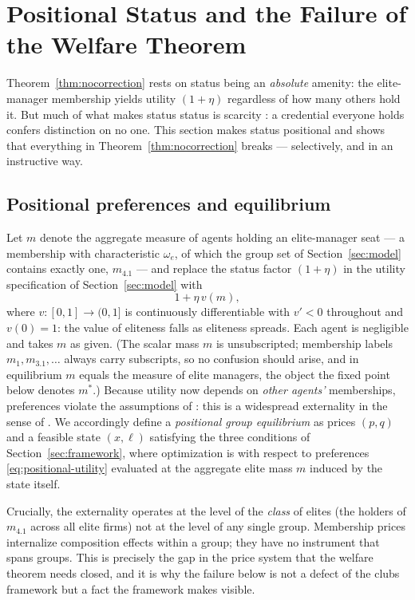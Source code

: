 \documentclass[12pt,letterpaper]{article}
\theoremstyle{definition}
\begin{document}
\section{Positional Status and the Failure of the Welfare Theorem}\label{sec:positional}

Theorem~\ref{thm:nocorrection} rests on status being an \emph{absolute} amenity: the elite-manager membership yields utility $(1+\eta)$ regardless of how many others hold it.
But much of what makes status status is scarcity \citep{hirsch1976social,frank1985demand}: a credential everyone holds confers distinction on no one.
This section makes status positional and shows that everything in Theorem~\ref{thm:nocorrection} breaks --- selectively, and in an instructive way.

\subsection{Positional preferences and equilibrium}

Let $m$ denote the aggregate measure of agents holding an elite-manager seat --- a membership with characteristic $\omega_e$, of which the group set of Section~\ref{sec:model} contains exactly one, $m_{4.1}$ --- and replace the status factor $(1+\eta)$ in the utility specification of Section~\ref{sec:model} with
\begin{equation}\label{eq:positional-utility}
  1 + \eta\, v(m),
\end{equation}
where $v:[0,1]\rightarrow(0,1]$ is continuously differentiable with $v'<0$ throughout and $v(0)=1$: the value of eliteness falls as eliteness spreads.
Each agent is negligible and takes $m$ as given.
(The scalar mass $m$ is unsubscripted; membership labels $m_1,m_{3.1},\dots$ always carry subscripts, so no confusion should arise, and in equilibrium $m$ equals the measure of elite managers, the object the fixed point below denotes $m^\ast$.)
Because utility now depends on \emph{other agents'} memberships, preferences violate the assumptions of \citet{ellickson2006organization}: this is a widespread externality in the sense of \citet{noguchizame2006externalities}.
We accordingly define a \emph{positional group equilibrium} as prices $(p,q)$ and a feasible state $(x,\ell)$ satisfying the three conditions of Section~\ref{sec:framework}, where optimization is with respect to preferences \eqref{eq:positional-utility} evaluated at the aggregate elite mass $m$ induced by the state itself.

Crucially, the externality operates at the level of the \emph{class} of elites (the holders of $m_{4.1}$ across all elite firms) not at the level of any single group.
Membership prices internalize composition effects within a group; they have no instrument that spans groups.
This is precisely the gap in the price system that the welfare theorem needs closed, and it is why the failure below is not a defect of the clubs framework but a fact the framework makes visible.
\end{document}
